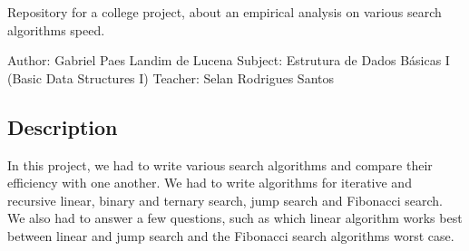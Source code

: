 Repository for a college project, about an empirical analysis on various search algorithms\textquotesingle{} speed.

Author\+: Gabriel Paes Landim de Lucena Subject\+: Estrutura de Dados Básicas I (Basic Data Structures I) Teacher\+: Selan Rodrigues Santos

\subsection*{Description}

In this project, we had to write various search algorithms and compare their efficiency with one another. We had to write algorithms for iterative and recursive linear, binary and ternary search, jump search and Fibonacci search. We also had to answer a few questions, such as which linear algorithm works best between linear and jump search and the Fibonacci search algorithm\textquotesingle{}s worst case. 